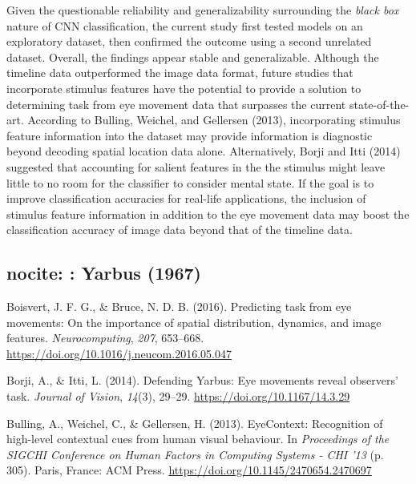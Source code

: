 \documentclass[
  english,
  man,floatsintext]{apa6}
\begin{document}
Given the questionable reliability and generalizability surrounding the \emph{black box} nature of CNN classification, the current study first tested models on an exploratory dataset, then confirmed the outcome using a second unrelated dataset. Overall, the findings appear stable and generalizable. Although the timeline data outperformed the image data format, future studies that incorporate stimulus features have the potential to provide a solution to determining task from eye movement data that surpasses the current state-of-the-art. According to Bulling, Weichel, and Gellersen (2013), incorporating stimulus feature information into the dataset may provide information is diagnostic beyond decoding spatial location data alone. Alternatively, Borji and Itti (2014) suggested that accounting for salient features in the the stimulus might leave little to no room for the classifier to consider mental state. If the goal is to improve classification accuracies for real-life applications, the inclusion of stimulus feature information in addition to the eye movement data may boost the classification accuracy of image data beyond that of the timeline data.

\hypertarget{section}{%
\subsection{\texorpdfstring{\newpage}{}}\label{section}}

\hypertarget{nocite-yarbuseyemovementsvision1967}{%
\subsection{nocite: : Yarbus (1967)}\label{nocite-yarbuseyemovementsvision1967}}

\begingroup
\setlength{\parindent}{-0.5in}
\setlength{\leftskip}{0.5in}

\hypertarget{refs}{}
\leavevmode\hypertarget{ref-boisvertPredictingTaskEye2016}{}%
Boisvert, J. F. G., \& Bruce, N. D. B. (2016). Predicting task from eye movements: On the importance of spatial distribution, dynamics, and image features. \emph{Neurocomputing}, \emph{207}, 653--668. \url{https://doi.org/10.1016/j.neucom.2016.05.047}

\leavevmode\hypertarget{ref-borjiDefendingYarbusEye2014a}{}%
Borji, A., \& Itti, L. (2014). Defending Yarbus: Eye movements reveal observers' task. \emph{Journal of Vision}, \emph{14}(3), 29--29. \url{https://doi.org/10.1167/14.3.29}

\leavevmode\hypertarget{ref-bullingEyeContextRecognitionHighlevel2013}{}%
Bulling, A., Weichel, C., \& Gellersen, H. (2013). EyeContext: Recognition of high-level contextual cues from human visual behaviour. In \emph{Proceedings of the SIGCHI Conference on Human Factors in Computing Systems - CHI '13} (p. 305). Paris, France: ACM Press. \url{https://doi.org/10.1145/2470654.2470697}
\end{document}
